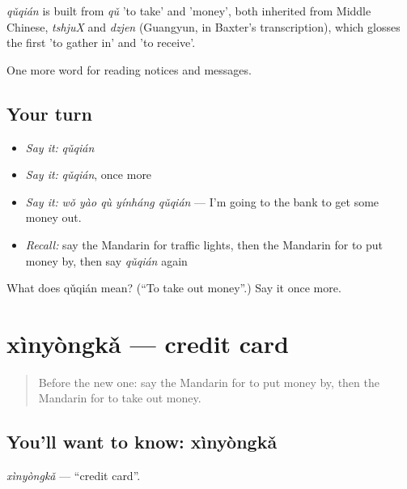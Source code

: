 \begin{cousinweb}
\emph{qǔqián} is built from \emph{qǔ} 'to take' and  'money', both inherited from Middle Chinese, \emph{tshjuX} and \emph{dzjen} (Guangyun, in Baxter's transcription), which glosses the first 'to gather in' and 'to receive'.
\end{cousinweb}

\begin{grammarlens}[title={What you've built}]
One more word for reading notices and messages.
\end{grammarlens}

\subsection*{Your turn}
\begin{itemize}
\raggedright
  \item \emph{Say it:} \emph{qǔqián}
  \item \emph{Say it:} \emph{qǔqián}, once more
  \item \emph{Say it:} \emph{wǒ yào qù yínháng qǔqián} — I'm going to the bank to get some money out.
  \item \emph{Recall:} say the Mandarin for traffic lights, then the Mandarin for to put money by, then say \emph{qǔqián} again
\end{itemize}

\begin{tcolorbox}[breakable,colback=teal!4,colframe=teal!35!black,title={Before you move on}]
What does qǔqián mean? (\textquotedblleft{}To take out money\textquotedblright{}.) Say it once more.
\end{tcolorbox}
\section[xìnyòngkǎ]{xìnyòngkǎ — credit card}

\label{lesson:ZH-C195-xinyongka}



\begin{quote}
Before the new one: say the Mandarin for to put money by, then the Mandarin for to take out money.
\end{quote}

\subsection*{You'll want to know: xìnyòngkǎ}
\emph{xìnyòngkǎ} — \textquotedblleft{}credit card\textquotedblright{}.

